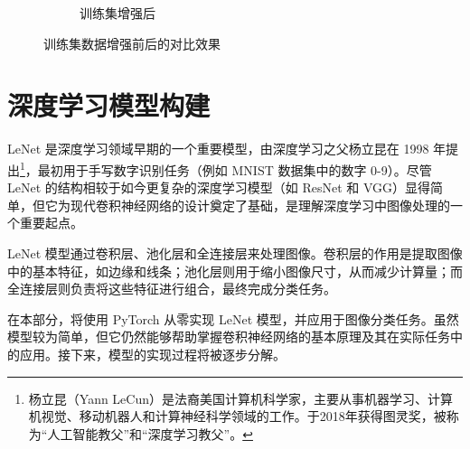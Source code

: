 \begin{figure}[ht]
\begin{subfigure}[b]{0.48\linewidth}
        \caption{训练集增强后}
        \label{训练集增强后}
    \end{subfigure}

    \captionsetup{font=small}  %
    \caption{训练集数据增强前后的对比效果}
    \label{训练集增强}
\end{figure}

\section{深度学习模型构建}
LeNet 是深度学习领域早期的一个重要模型，由深度学习之父杨立昆在 1998 年提出\footnote{杨立昆（Yann LeCun）是法裔美国计算机科学家，主要从事机器学习、计算机视觉、移动机器人和计算神经科学领域的工作。于2018年获得图灵奖，被称为“人工智能教父”和“深度学习教父”。}，最初用于手写数字识别任务（例如 MNIST 数据集中的数字 0-9）。尽管 LeNet 的结构相较于如今更复杂的深度学习模型（如 ResNet 和 VGG）显得简单，但它为现代卷积神经网络的设计奠定了基础，是理解深度学习中图像处理的一个重要起点。

LeNet 模型通过卷积层、池化层和全连接层来处理图像。卷积层的作用是提取图像中的基本特征，如边缘和线条；池化层则用于缩小图像尺寸，从而减少计算量；而全连接层则负责将这些特征进行组合，最终完成分类任务。

在本部分，将使用 PyTorch 从零实现 LeNet 模型，并应用于图像分类任务。虽然模型较为简单，但它仍然能够帮助掌握卷积神经网络的基本原理及其在实际任务中的应用。接下来，模型的实现过程将被逐步分解。


